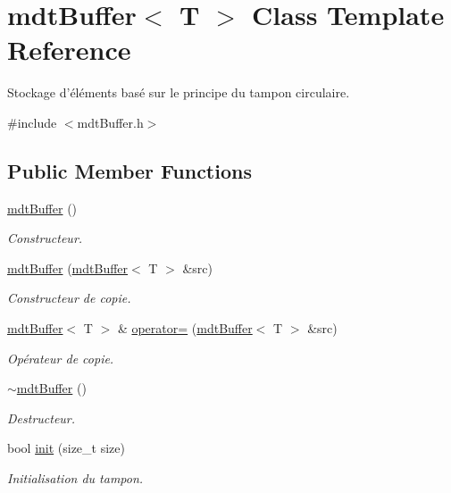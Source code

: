 \hypertarget{classmdt_buffer}{\section{mdt\-Buffer$<$ T $>$ Class Template Reference}
\label{classmdt_buffer}
}


Stockage d'éléments basé sur le principe du tampon circulaire.  




{\ttfamily \#include $<$mdt\-Buffer.\-h$>$}

\subsection*{Public Member Functions}
\begin{DoxyCompactItemize}
\item 
\hyperlink{classmdt_buffer_a51bc78e5a9fc926c7b898160c6a2faa3}{mdt\-Buffer} ()
\begin{DoxyCompactList}\small\item\em Constructeur. \end{DoxyCompactList}\item 
\hyperlink{classmdt_buffer_a4d6c140c02257fffb37016d019e412cf}{mdt\-Buffer} (\hyperlink{classmdt_buffer}{mdt\-Buffer}$<$ T $>$ \&src)
\begin{DoxyCompactList}\small\item\em Constructeur de copie. \end{DoxyCompactList}\item 
\hyperlink{classmdt_buffer}{mdt\-Buffer}$<$ T $>$ \& \hyperlink{classmdt_buffer_aba9a31eb29a39a2721205f13f80c1d8d}{operator=} (\hyperlink{classmdt_buffer}{mdt\-Buffer}$<$ T $>$ \&src)
\begin{DoxyCompactList}\small\item\em Opérateur de copie. \end{DoxyCompactList}\item 
\hyperlink{classmdt_buffer_a54de4cebee3cab7b8c1b86bfc3bdad4f}{$\sim$mdt\-Buffer} ()
\begin{DoxyCompactList}\small\item\em Destructeur. \end{DoxyCompactList}\item 
bool \hyperlink{classmdt_buffer_a9d081b06f666fec3ff6e12ec94b2a4fd}{init} (size\-\_\-t size)
\begin{DoxyCompactList}\small\item\em Initialisation du tampon. \end{DoxyCompactList}\item 

\end{DoxyCompactItemize}
